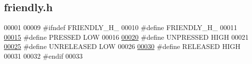 \hypertarget{friendly_8h_source}{}\subsection{friendly.\+h}
\label{friendly_8h_source}

\begin{DoxyCode}
00001 
00009 \textcolor{preprocessor}{#ifndef FRIENDLY\_H\_}
00010 \textcolor{preprocessor}{#define FRIENDLY\_H\_}
00011 
\hypertarget{friendly_8h_source.tex_l00015}{}\hyperlink{friendly_8h_a654adff3c664f27f0b29c24af818dd26}{00015} \textcolor{preprocessor}{#define PRESSED LOW}
00016 
\hypertarget{friendly_8h_source.tex_l00020}{}\hyperlink{friendly_8h_ab165b69b767feb15cba30d2fabcb11cd}{00020} \textcolor{preprocessor}{#define UNPRESSED HIGH}
00021 
\hypertarget{friendly_8h_source.tex_l00025}{}\hyperlink{friendly_8h_a0515f466542f13cfcb0684db1934e193}{00025} \textcolor{preprocessor}{#define UNRELEASED LOW}
00026 
\hypertarget{friendly_8h_source.tex_l00030}{}\hyperlink{friendly_8h_ad74b7f5218b46c8332cd531df7178d45}{00030} \textcolor{preprocessor}{#define RELEASED HIGH}
00031 
00032 \textcolor{preprocessor}{#endif}
00033 
\end{DoxyCode}

